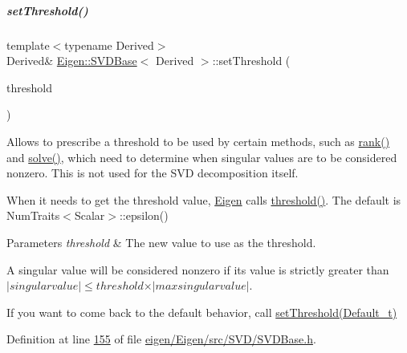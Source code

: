 \mbox{\label{group___s_v_d___module_a1c95d05398fc15e410a28560ef70a5a6}} 
\subparagraph{\texorpdfstring{set\+Threshold()}{setThreshold()}\hspace{0.1cm}{\footnotesize\ttfamily [1/4]}}
{\footnotesize\ttfamily template$<$typename Derived$>$ \\
Derived\& \hyperlink{group___s_v_d___module_class_eigen_1_1_s_v_d_base}{Eigen\+::\+S\+V\+D\+Base}$<$ Derived $>$\+::set\+Threshold (\begin{DoxyParamCaption}\item[{const Real\+Scalar \&}]{threshold }\end{DoxyParamCaption})\hspace{0.3cm}{\ttfamily [inline]}}

Allows to prescribe a threshold to be used by certain methods, such as \hyperlink{group___s_v_d___module_a30b89e24f42f1692079eea31b361d26a}{rank()} and \hyperlink{group___s_v_d___module_ab28499936c0764fe5b56b9f4de701e26}{solve()}, which need to determine when singular values are to be considered nonzero. This is not used for the S\+VD decomposition itself.

When it needs to get the threshold value, \hyperlink{namespace_eigen}{Eigen} calls \hyperlink{group___s_v_d___module_a98b2ee98690358951807353812a05c69}{threshold()}. The default is {\ttfamily Num\+Traits$<$\+Scalar$>$\+::epsilon()} 


\begin{DoxyParams}{Parameters}
{\em threshold} & The new value to use as the threshold.\\
\hline
\end{DoxyParams}
A singular value will be considered nonzero if its value is strictly greater than $ \vert singular value \vert \leqslant threshold \times \vert max singular value \vert $.

If you want to come back to the default behavior, call \hyperlink{group___s_v_d___module_a27586b69dbfb63f714d1d45fd6304f97}{set\+Threshold(\+Default\+\_\+t)} 

Definition at line \hyperlink{eigen_2_eigen_2src_2_s_v_d_2_s_v_d_base_8h_source_l00155}{155} of file \hyperlink{eigen_2_eigen_2src_2_s_v_d_2_s_v_d_base_8h_source}{eigen/\+Eigen/src/\+S\+V\+D/\+S\+V\+D\+Base.\+h}.

